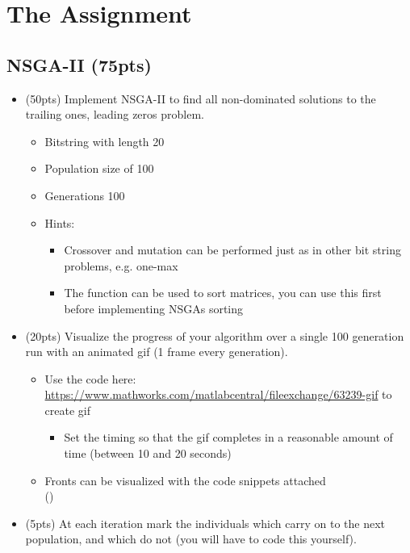 \documentclass{article}
\begin{document}
\newpage
\section{The Assignment}

\subsection{NSGA-II (75pts)}
\begin{itemize}
	\item (50pts) Implement NSGA-II to find all non-dominated solutions to the trailing ones, leading zeros problem. 
	\begin{itemize}
		\item Bitstring with length 20
		\item Population size of 100
		\item Generations 100
		\item Hints:
		\begin{itemize}
			\item Crossover and mutation can be performed just as in other bit string problems, e.g. one-max
			\item The  function can be used to sort matrices, you can use this first before implementing NSGAs sorting
		\end{itemize}
	\end{itemize}
	\item (20pts) Visualize the progress of your algorithm over a single 100 generation run with an animated gif (1 frame every generation).
	\begin{itemize}
		\item Use the code here: \url{https://www.mathworks.com/matlabcentral/fileexchange/63239-gif} to create gif
		\begin{itemize}
			\item Set the timing so that the gif completes in a reasonable amount of time (between 10 and 20 seconds)
		\end{itemize}
		\item Fronts can be visualized with the code snippets attached\\ ()
	\end{itemize}
	\item (5pts) At each iteration mark the individuals which carry on to the next population, and which do not (you will have to code this yourself).
\end{itemize}

\newpage
\end{document}
